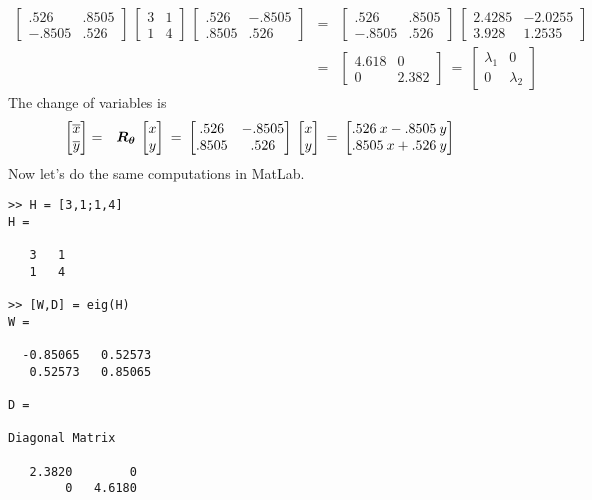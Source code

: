 \documentclass[11pt]{SelfArxOneColBMN}
\begin{document}
\begin{eqnarray*}
\begin{bmatrix} .526 & .8505\\ -.8505 & .526 \end{bmatrix}
\: \begin{bmatrix} 3 & 1 \\ 1 & 4 \end{bmatrix}
\: \begin{bmatrix} .526 & -.8505\\ .8505 & .526 \end{bmatrix}
&=&
\begin{bmatrix} .526 & .8505\\ -.8505 & .526 \end{bmatrix}
\: \begin{bmatrix} 2.4285 & -2.0255 \\ 3.928 & 1.2535 \end{bmatrix}\\
&= &
\begin{bmatrix} 4.618& 0\\ 0 & 2.382 \end{bmatrix}
\: = \:
\begin{bmatrix} \lambda_1& 0\\ 0 & \lambda_2 \end{bmatrix}
\end{eqnarray*}
\noindent
The change of variables is
\begin{eqnarray*}
\begin{bmatrix} \overline{x}\\\overline{y}\end{bmatrix}
&=& \boldsymbol{R_\theta} \: \begin{bmatrix} x\\y\end{bmatrix}
\: = \:
\begin{bmatrix} .526 & -.8505\\ .8505 & .526 \end{bmatrix}
\: \begin{bmatrix} x\\y\end{bmatrix}
\: = \:
\begin{bmatrix} .526 \:x  - .8505 \:y\\.8505 \:x + .526\: y\end{bmatrix}
\end{eqnarray*}
\noindent
Now let's do the same computations in MatLab.

\begin{lstlisting}
>> H = [3,1;1,4]
H =

   3   1
   1   4

>> [W,D] = eig(H)
W =

  -0.85065   0.52573
   0.52573   0.85065

D =

Diagonal Matrix

   2.3820        0
        0   4.6180
\end{lstlisting}
\lstset{fancyvrb=false}
\end{document}
